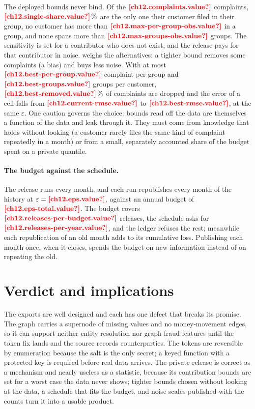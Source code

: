 The deployed bounds never bind. Of the $\est{ch12.complaints}{value}$ complaints, $\est{ch12.single-share}{value}\,\%$ are the only
one their customer filed in their group, no customer has more than $\est{ch12.max-per-group-obs}{value}$ in a group, and none
spans more than $\est{ch12.max-groups-obs}{value}$ groups. The sensitivity is set for a contributor who does not exist, and
the release pays for that contributor in noise.  weighs the alternatives: a tighter bound removes some
complaints (a bias) and buys less noise. With at most $\est{ch12.best-per-group}{value}$ complaint per group and
$\est{ch12.best-groups}{value}$ groups per customer, $\est{ch12.best-removed}{value}\,\%$ of complaints are dropped and the error
of a cell falls from $\est{ch12.current-rmse}{value}$ to $\est{ch12.best-rmse}{value}$, at the same $\varepsilon$. One caution
governs the choice: bounds read off the data are themselves a function of the data and leak through it. They must come from
knowledge that holds without looking (a customer rarely files the same kind of complaint repeatedly in a month) or from a small,
separately accounted share of the budget spent on a private quantile.



\paragraph{The budget against the schedule.} The release runs every month, and each run republishes every month of the history
at $\varepsilon = \est{ch12.eps}{value}$, against an annual budget of $\est{ch12.eps-total}{value}$. The budget covers
$\est{ch12.releases-per-budget}{value}$ releases, the schedule asks for $\est{ch12.releases-per-year}{value}$, and the ledger
refuses the rest; meanwhile each republication of an old month adds to its cumulative loss. Publishing each month once,
when it closes, spends the budget on new information instead of on repeating the old.

\section{Verdict and implications}\label{sec:gp-verdict}

The exports are well designed and each has one defect that breaks its promise. The graph carries a supernode of missing
values and no money-movement edges, so it can support neither entity resolution nor graph fraud features until the token fix
lands and the source records counterparties. The tokens are reversible by enumeration because the salt is the only secret;
a keyed function with a protected key is required before real data arrives. The private release is correct as a mechanism
and nearly useless as a statistic, because its contribution bounds are set for a worst case the data never shows; tighter
bounds chosen without looking at the data, a schedule that fits the budget, and noise scales published with the counts
turn it into a usable product.

